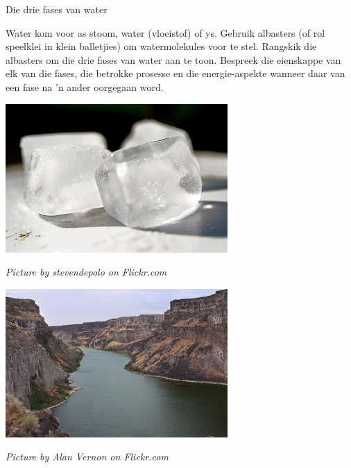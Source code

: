 \begin{activity}{Die drie fases van water}
\begin{minipage}{0.5\textwidth}
Water kom voor as stoom, water (vloeistof) of ys. Gebruik albasters (of rol speelklei in klein balletjies) om watermolekules voor te stel. Rangskik die albasters om die drie fases van water aan te toon. Bespreek die eienskappe van elk van die fases, die betrokke prosesse en die energie-aspekte wanneer daar van een fase na  'n ander oorgegaan word.
\end{minipage}
\begin{minipage}{.5\textwidth}
\begin{center}
 \includegraphics[width=.3\textwidth]{photos/iceby-stevendepolo-flickr.jpg}\par
\textit{Picture by stevendepolo on Flickr.com}
\end{center}
\begin{center}
 \includegraphics[width=.3\textwidth]{photos/AlanVernon.jpg}\par
\textit{Picture by Alan Vernon on Flickr.com}
\end{center}
\end{minipage}
\end{activity}

